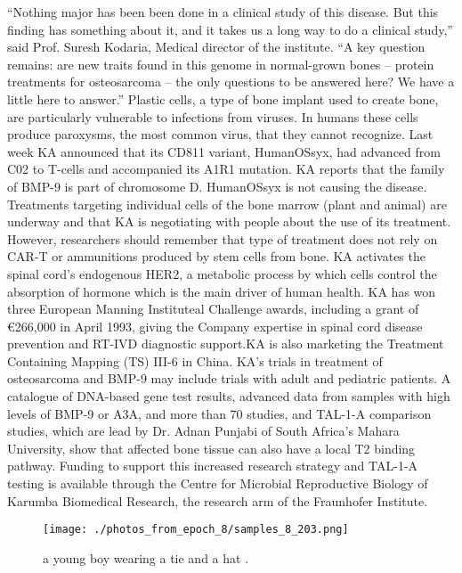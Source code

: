 \documentclass{article}%
\begin{document}
“Nothing major has been been done in a clinical study of this disease. But this finding has something about it, and it takes us a long way to do a clinical study,” said Prof. Suresh Kodaria, Medical director of the institute. “A key question remains: are new traits found in this genome in normal{-}grown bones – protein treatments for osteosarcoma – the only questions to be answered here? We have a little here to answer.”\newline%
Plastic cells, a type of bone implant used to create bone, are particularly vulnerable to infections from viruses. In humans these cells produce paroxysms, the most common virus, that they cannot recognize. Last week KA announced that its CD811 variant, HumanOSsyx, had advanced from C02 to T{-}cells and accompanied its A1R1 mutation. KA reports that the family of BMP{-}9 is part of chromosome D.\newline%
HumanOSsyx is not causing the disease. Treatments targeting individual cells of the bone marrow (plant and animal) are underway and that KA is negotiating with people about the use of its treatment. However, researchers should remember that type of treatment does not rely on CAR{-}T or ammunitions produced by stem cells from bone. KA activates the spinal cord’s endogenous HER2, a metabolic process by which cells control the absorption of hormone which is the main driver of human health.\newline%
KA has won three European Manning Instituteal Challenge awards, including a grant of €266,000 in April 1993, giving the Company expertise in spinal cord disease prevention and RT{-}IVD diagnostic support.KA is also marketing the Treatment Containing Mapping (TS) III{-}6 in China. KA’s trials in treatment of osteosarcoma and BMP{-}9 may include trials with adult and pediatric patients.\newline%
A catalogue of DNA{-}based gene test results, advanced data from samples with high levels of BMP{-}9 or A3A, and more than 70 studies, and TAL{-}1{-}A comparison studies, which are lead by Dr. Adnan Punjabi of South Africa’s Mahara University, show that affected bone tissue can also have a local T2 binding pathway.\newline%
Funding to support this increased research strategy and TAL{-}1{-}A testing is available through the Centre for Microbial Reproductive Biology of Karumba Biomedical Research, the research arm of the Fraunhofer Institute.\newline%

%


\begin{figure}[h!]%
\centering%
\texttt{[image: ./photos\_from\_epoch\_8/samples\_8\_203.png]}%
\caption{a young boy wearing a tie and a hat .}%
\end{figure}

%
\end{document}
